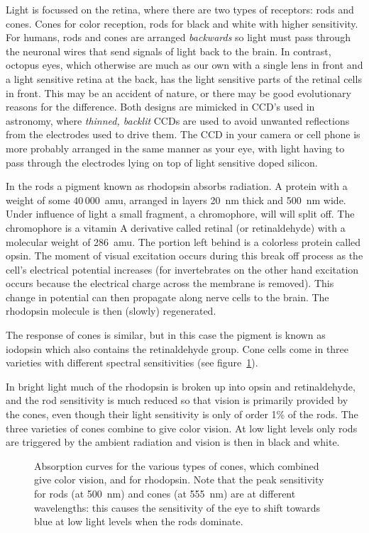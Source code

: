\documentclass{article}
\begin{document}
Light is focussed on the retina, where there are two types of
receptors: rods and cones. Cones for color reception, rods for black
and white with higher sensitivity. For humans, rods and cones are
arranged {\it backwards} so light must pass through the neuronal wires
that send signals of light back to the brain. In contrast, octopus
eyes, which otherwise are much as our own with a single lens in front
and a light sensitive retina at the back, has the light sensitive
parts of the retinal cells in front. This may be an accident of
nature, or there may be good evolutionary reasons for
the difference. Both designs are mimicked in CCD's used in astronomy,
where {\it thinned, backlit} CCDs are used to avoid unwanted reflections from
the electrodes used to drive them. The CCD in your camera or cell
phone is more probably arranged in the same manner as your eye, with
light having to pass through the electrodes lying on top of light
sensitive doped silicon.

In the rods a pigment known as rhodopsin absorbs radiation. A protein
with a weight of some $40\,000$~amu, arranged in layers 20~nm thick
and 500~nm wide. Under influence of light a small fragment, a
chromophore, will will split off. The chromophore is a vitamin A
derivative called retinal (or retinaldehyde) with a molecular weight
of 286~amu. The portion left behind is a colorless protein called opsin. 
The moment of visual excitation occurs during this break
off process as the cell's electrical potential increases (for
invertebrates on the other hand excitation occurs because the
electrical charge across the membrane is removed). This change in
potential can then propagate along nerve cells to the brain. The
rhodopsin molecule is then (slowly) regenerated. 

The response of cones is similar, but in this case the pigment is
known as iodopsin which also contains the retinaldehyde group. Cone
cells come in three varieties with different spectral sensitivities
(see figure~\ref{fig:absorption-rod-cone}).

In bright light much of the rhodopsin is broken up into opsin and
retinaldehyde, and the rod sensitivity is much reduced so that vision
is primarily provided by the cones, even though their light sensitivity
is only of order 1\% of the rods. The three varieties of cones combine
to give color vision. At low light levels only rods are triggered by
the ambient radiation and vision is then in black and white. 

\begin{figure}[h!]
\hfil{}\hfil
\caption{Absorption curves for the various types of cones, which combined
give color vision, and for rhodopsin. Note that the peak sensitivity
for rods (at 500~nm) and cones (at 555~nm) are at different wavelengths: this causes the
sensitivity of the eye to shift towards blue at low light levels when
the rods dominate.}
\label{fig:absorption-rod-cone}
\end{figure}
\end{document}
